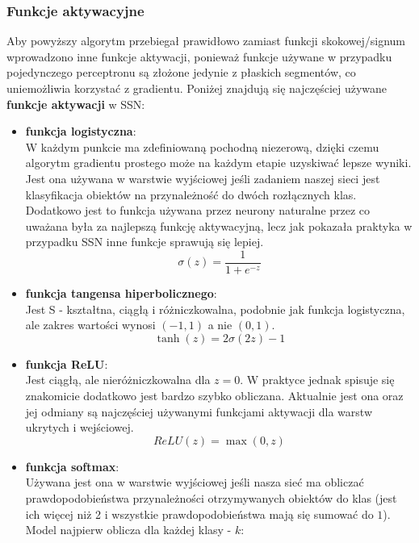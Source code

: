 \documentclass{article}
\begin{document}
\subsubsection{Funkcje aktywacyjne}
Aby powyższy algorytm przebiegał prawidłowo zamiast funkcji skokowej/signum wprowadzono inne 
funkcje aktywacji, ponieważ funkcje używane w przypadku pojedynczego perceptronu są złożone
jedynie z płaskich segmentów, co uniemożliwia korzystać z gradientu. Poniżej znajdują się 
najczęściej używane \textbf{funkcje aktywacji} w SSN:
\begin{itemize}
\item \textbf{funkcja logistyczna}:\\
W każdym punkcie ma zdefiniowaną pochodną niezerową, dzięki czemu algorytm gradientu prostego
może na każdym etapie uzyskiwać lepsze wyniki. Jest ona używana w warstwie wyjściowej jeśli
zadaniem naszej sieci jest klasyfikacja obiektów na przynależność do dwóch rozłącznych klas.
Dodatkowo jest to funkcja używana przez neurony 
naturalne przez co uważana była za najlepszą funkcję aktywacyjną, lecz jak pokazała praktyka
w przypadku SSN inne funkcje sprawują się lepiej.
\begin{equation}
\sigma(z) = \frac{1}{1 + e^{-z}}
\end{equation}
\item \textbf{funkcja tangensa hiperbolicznego}:\\
Jest S - kształtna, ciągłą i różniczkowalna, podobnie jak funkcja logistyczna, 
ale zakres wartości wynosi $(-1, 1)$ a nie $(0, 1)$.
\begin{equation}
	\tanh(z) = 2\sigma(2z)-1
\end{equation}
\item \textbf{funkcja ReLU}:\\
Jest ciągłą, ale nieróżniczkowalna dla $z = 0$. W praktyce jednak spisuje się znakomicie 
dodatkowo jest bardzo szybko obliczana. Aktualnie jest ona oraz jej odmiany są najczęściej
używanymi funkcjami aktywacji dla warstw ukrytych i wejściowej. 
\begin{equation}
	ReLU(z) = \max(0, z)
\end{equation}
\item \textbf{funkcja softmax}:\\
Używana jest ona w warstwie wyjściowej jeśli nasza sieć ma obliczać
prawdopodobieństwa przynależności otrzymywanych obiektów  do klas 
(jest ich więcej niż 2 i wszystkie prawdopodobieństwa mają się sumować do $1$).
Model najpierw oblicza dla każdej klasy - $k$:
\begin{equation}

\end{equation}
\end{itemize}
\end{document}
